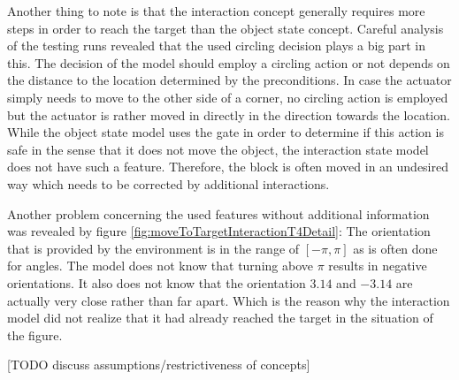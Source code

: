 Another thing to note is that the interaction concept generally requires more steps in order to reach the target than the object state concept. Careful analysis of the testing runs revealed that the used circling decision plays a big part in this. The decision of the model should employ a circling action or not depends on the distance to the location determined by the preconditions. In case the actuator simply needs to move to the other side of a corner, no circling action is employed but the actuator is rather moved in directly in the direction towards the location. While the object state model uses the gate in order to determine if this action is safe in the sense that it does not move the object, the interaction state model does not have such a feature. Therefore, the block is often moved in an undesired way which needs to be corrected by additional interactions.

Another problem concerning the used features without additional information was revealed by figure \ref{fig:moveToTargetInteractionT4Detail}: The orientation that is provided by the environment is in the range of $[-\pi,\pi]$ as is often done for angles. The model does not know that turning above $\pi$ results in negative orientations. It also does not know that the orientation $3.14$ and $-3.14$ are actually very close rather than far apart. Which is the reason why the interaction model did not realize that it had already reached the target in the situation of the figure. 

[TODO discuss assumptions/restrictiveness of concepts]